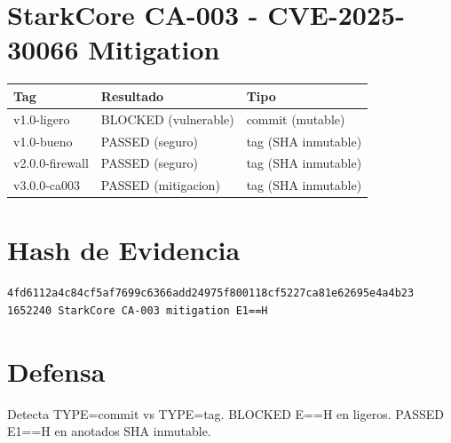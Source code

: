 \documentclass{article}
\begin{document}
\section*{StarkCore CA-003 - CVE-2025-30066 Mitigation}

\begin{longtable}{|l|l|l|}
\hline
\textbf{Tag} & \textbf{Resultado} & \textbf{Tipo} \\
\hline
v1.0-ligero & BLOCKED (vulnerable) & commit (mutable) \\
v1.0-bueno & PASSED (seguro) & tag (SHA inmutable) \\
v2.0.0-firewall & PASSED (seguro) & tag (SHA inmutable) \\
v3.0.0-ca003 & PASSED (mitigacion) & tag (SHA inmutable) \\
\hline
\end{longtable}

\section*{Hash de Evidencia}
\begin{verbatim}
4fd6112a4c84cf5af7699c6366add24975f800118cf5227ca81e62695e4a4b23
1652240 StarkCore CA-003 mitigation E1==H
\end{verbatim}

\section*{Defensa}
Detecta TYPE=commit vs TYPE=tag. BLOCKED E==H en ligeros. PASSED E1==H en anotados SHA inmutable.
\end{document}
